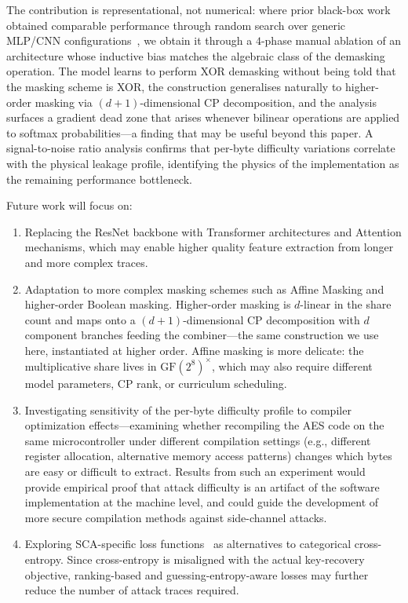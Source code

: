 \documentclass[runningheads]{llncs}
\newcommand{\GF}{\mathrm{GF}}
\begin{document}
The contribution is representational, not numerical: where prior black-box work obtained comparable performance through random search over generic MLP/CNN configurations~\cite{perin2022exploring}, we obtain it through a $4$-phase manual ablation of an architecture whose inductive bias matches the algebraic class of the demasking operation.
The model learns to perform XOR demasking without being told that the masking scheme is XOR, the construction generalises naturally to higher-order masking via $(d{+}1)$-dimensional CP decomposition, and the analysis surfaces a gradient dead zone that arises whenever bilinear operations are applied to softmax probabilities---a finding that may be useful beyond this paper.
A signal-to-noise ratio analysis confirms that per-byte difficulty variations correlate with the physical leakage profile, identifying the physics of the implementation as the remaining performance bottleneck.

Future work will focus on:
\begin{enumerate}[leftmargin=*]
  \item Replacing the ResNet backbone with Transformer architectures and Attention mechanisms, which may enable higher quality feature extraction from longer and more complex traces.

  \item Adaptation to more complex masking schemes such as Affine Masking and higher-order Boolean masking.
  Higher-order masking is $d$-linear in the share count and maps onto a $(d{+}1)$-dimensional CP decomposition with $d$ component branches feeding the combiner---the same construction we use here, instantiated at higher order.
  Affine masking is more delicate: the multiplicative share lives in $\GF(2^8)^{\times}$, which may also require different model parameters, CP rank, or curriculum scheduling.

  \item Investigating sensitivity of the per-byte difficulty profile to compiler optimization effects---examining whether recompiling the AES code on the same microcontroller under different compilation settings (e.g., different register allocation, alternative memory access patterns) changes which bytes are easy or difficult to extract.
  Results from such an experiment would provide empirical proof that attack difficulty is an artifact of the software implementation at the machine level, and could guide the development of more secure compilation methods against side-channel attacks.

  \item Exploring SCA-specific loss functions~\cite{kerkhof2023noloss} as alternatives to categorical cross-entropy.
  Since cross-entropy is misaligned with the actual key-recovery objective, ranking-based and guessing-entropy-aware losses may further reduce the number of attack traces required.
\end{enumerate}
\end{document}
